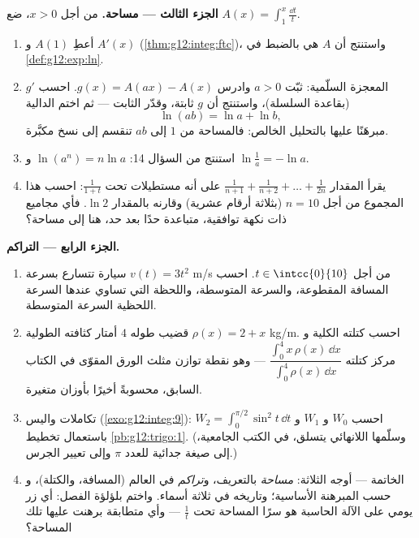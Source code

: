\begin{problem}
\medskip
\noindent\textbf{الجزء الثالث ---  مساحة.}
من أجل $x > 0$، ضع
$A(x) = \displaystyle\int_1^x \frac{\dd t}{t}$.
\begin{enumerate}[resume]
  \item أعطِ $A(1)$ و $A'(x)$
        (\cref{thm:g12:integ:ftc})، واستنتج أن $A$ هي
        بالضبط  في
        \cref{def:g12:exp:ln}.
  \item المعجزة السلّمية: ثبّت $a > 0$ وادرس
        $g(x) = A(ax) - A(x)$. احسب $g'$ (بقاعدة السلسلة)،
        واستنتج أن $g$ ثابتة، وقدّر الثابت ---
        ثم اختم  الدالية
        \[
        \ln(ab) = \ln a + \ln b ,
        \]
        مبرهَنًا عليها بالتحليل الخالص: فالمساحة من $1$ إلى $ab$
        تنقسم إلى نسخ مكبَّرة.
  \item استنتج من السؤال 14: $\ln(a^n) = n\ln a$ و
        $\ln\frac1a = -\ln a$.
  \item يقرأ  المقدار
        $\frac{1}{n+1} + \frac{1}{n+2} + \dots + \frac{1}{2n}$
        على أنه مستطيلات تحت $\frac{1}{1 + t}$: احسب هذا المجموع
        من أجل $n = 10$ (بثلاثة أرقام عشرية) وقارنه بالمقدار
        $\ln 2$. فأي مجاميع ذات نكهة توافقية، متباعدة حدًا
        بعد حد،  هنا إلى مساحة؟
\end{enumerate}

\medskip
\noindent\textbf{الجزء الرابع --- التراكم.}
\begin{enumerate}[resume]
  \item سيارة تتسارع بسرعة $v(t) = 3t^2$ m/s من أجل
        $t \in \intcc{0}{10}$. احسب المسافة المقطوعة،
        والسرعة المتوسطة، واللحظة التي تساوي عندها السرعة
        اللحظية السرعة المتوسطة.
  \item قضيب طوله $4$ أمتار كثافته الطولية
        $\rho(x) = 2 + x$ kg/m. احسب كتلته الكلية و
        مركز كتلته
        $\dfrac{\int_0^4 x\,\rho(x)\,\dd x}{\int_0^4
        \rho(x)\,\dd x}$ --- وهو نقطة توازن مثلث الورق المقوّى
        في الكتاب السابق، محسوبةً أخيرًا
        بأوزان متغيرة.
  \item تكاملات واليس (\cref{exo:g12:integ:9}): احسب
        $W_0$ و $W_1$ و
        $W_2 = \int_0^{\pi/2} \sin^2 t\,\dd t$ باستعمال
        تخطيط \cref{pb:g12:trigo:1}. (وسلّمها اللانهائي
        يتسلق، في الكتب الجامعية، إلى صيغة جدائية
        للعدد $\pi$ وإلى تعيير 
        الجرس.)
  \item الخاتمة --- أوجه  الثلاثة: \emph{مساحة}
        بالتعريف، و\emph{تراكم} في العالم
        (المسافة، والكتلة)، و\emph{} حسب
        المبرهنة الأساسية؛ وتاريخه في ثلاثة أسماء.
        واختم بلؤلؤة الفصل: أي زر يومي
        على الآلة الحاسبة هو سرًا المساحة تحت
        $\frac1t$ --- وأي متطابقة برهنت عليها تلك المساحة؟
\end{enumerate}
\end{problem}
